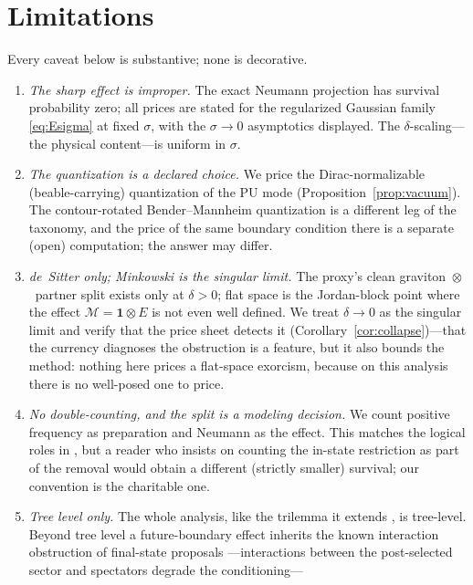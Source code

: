 \documentclass[11pt]{article}
\theoremstyle{definition}
\theoremstyle{remark}
\begin{document}
\section{Limitations}
\label{sec:limitations}

Every caveat below is substantive; none is decorative.

\begin{enumerate}
\item \emph{The sharp effect is improper.} The exact Neumann
projection has survival probability zero; all prices are stated for
the regularized Gaussian family \eqref{eq:Esigma} at fixed
$\sigma$, with the $\sigma\to0$ asymptotics displayed. The
$\delta$-scaling---the physical content---is uniform in $\sigma$.
\item \emph{The quantization is a declared choice.} We price the
Dirac-normalizable (beable-carrying) quantization of the PU mode
(Proposition~\ref{prop:vacuum}). The contour-rotated Bender--Mannheim
quantization \cite{BenderMannheim2008} is a different leg of the
taxonomy, and the price of the same boundary condition there is a
separate (open) computation; the answer may differ.
\item \emph{de~Sitter only; Minkowski is the singular limit.} The
proxy's clean graviton~$\otimes$~partner split exists only at
$\delta>0$; flat space is the Jordan-block point where the effect
$\mathcal{M}=\mathbf{1}\otimes E$ is not even well defined. We treat
$\delta\to0$ as the singular limit and verify that the price sheet
detects it (Corollary~\ref{cor:collapse})---that the currency
diagnoses the obstruction is a feature, but it also bounds the
method: nothing here prices a flat-space exorcism, because on this
analysis there is no well-posed one to price.
\item \emph{No double-counting, and the split is a modeling
decision.} We count positive frequency as preparation and Neumann as
the effect. This matches the logical roles in
\cite{Maldacena2011}, but a reader who insists on counting the
in-state restriction as part of the removal would obtain a different
(strictly smaller) survival; our convention is the charitable one.
\item \emph{Tree level only.} The whole analysis, like the trilemma
it extends \cite{choosing}, is tree-level. Beyond tree level a
future-boundary effect inherits the known interaction obstruction of
final-state proposals \cite{HorowitzMaldacena}---interactions between
the post-selected sector and spectators degrade the conditioning---%

\end{enumerate}
\end{document}

